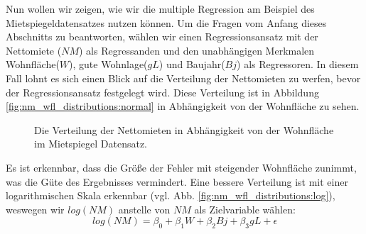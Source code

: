 Nun wollen wir zeigen, wie wir die multiple Regression am Beispiel des Mietspiegeldatensatzes nutzen können.
Um die Fragen vom Anfang dieses Abschnitts zu beantworten, wählen wir einen Regressionsansatz mit der Nettomiete ($NM$) als Regressanden und den unabhängigen Merkmalen Wohnfläche($W$), gute Wohnlage($gL$) und Baujahr($Bj$) als Regressoren.
In diesem Fall lohnt es sich einen Blick auf die Verteilung der Nettomieten zu werfen, bevor der Regressionsansatz festgelegt wird.
Diese Verteilung ist in Abbildung \ref{fig:nm_wfl_distributions:normal} in Abhängigkeit von der Wohnfläche zu sehen.
\begin{figure}[t]
  \centering
  \begin{narrow}{-0.2\textwidth}{0.2\textwidth}
   
  \end{narrow}
  \caption{Die Verteilung der Nettomieten in Abhängigkeit von der Wohnfläche im Mietspiegel Datensatz.}
  \label{fig:nm_wfl_distributions}
\end{figure}
Es ist erkennbar, dass die Größe der Fehler mit steigender Wohnfläche zunimmt, was die Güte des Ergebnisses vermindert.
Eine bessere Verteilung ist mit einer logarithmischen Skala erkennbar (vgl. Abb. \ref{fig:nm_wfl_distributions:log}), weswegen wir $log(NM)$ anstelle von $NM$ als Zielvariable wählen:
\begin{equation*}
 log(NM) = \beta_0 + \beta_1 W + \beta_2 Bj + \beta_3 gL + \epsilon
\end{equation*}

